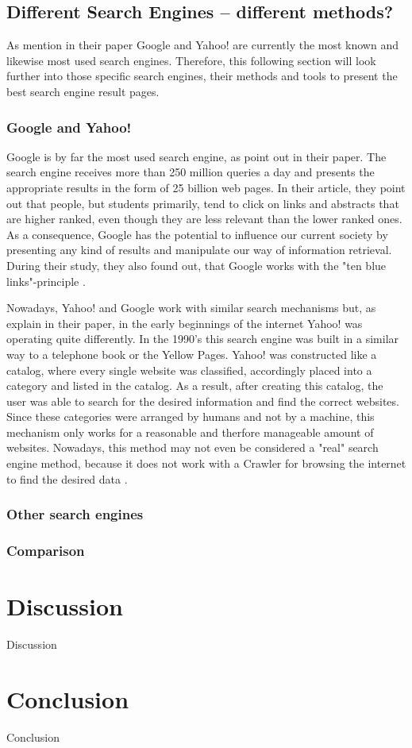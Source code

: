\subsection{Different Search Engines -- different methods?}
\label{subsection:SearchEngine}
As \textcite{pan2007google, agrawal2015study} mention in their paper Google and Yahoo! are currently the most known and likewise most used search engines. Therefore, this following section will look further into those specific search engines, their methods and tools to present the best search engine result pages. 

\subsubsection{Google and Yahoo!}
Google is by far the most used search engine, as \textcite{pan2007google} point out in their paper. The search engine receives more than 250 million queries a day and presents the appropriate results in the form of 25 billion web pages. In their article, they point out that people, but students primarily, tend to click on links and abstracts that are higher ranked, even though they are less relevant than the lower ranked ones. As a consequence, Google has the potential to influence our current society by presenting any kind of results and manipulate our way of information retrieval. During their study, they also found out, that Google works with the "ten blue links"-principle \autocite{pan2007google}.

Nowadays, Yahoo! and Google work with similar search mechanisms but, as \textcite{weber2011search} explain in their paper, in the early beginnings of the internet Yahoo! was operating quite differently. 
In the 1990's this search engine was built in a similar way to a telephone book or the Yellow Pages. Yahoo! was constructed like a catalog, where every single website was classified, accordingly placed into a category and listed in the catalog. As a result, after creating this catalog, the user was able to search for the desired information and find the correct websites. Since these categories were arranged by humans and not by a machine, this mechanism only works for a reasonable and therfore manageable amount of websites. Nowadays, this method may not even be considered a "real" search engine method, because it does not work with a Crawler for browsing the internet to find the desired data \autocite{weber2011search}.



\subsubsection{Other search engines}

\subsubsection{Comparison}



\section{Discussion}
\label{section:Discussion}
Discussion

\section{Conclusion}
\label{section:Conclusion}
Conclusion



